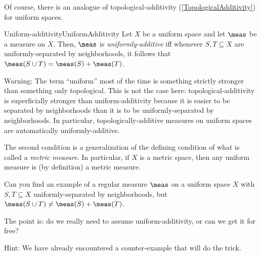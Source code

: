 Of course, there is an analogue of topological-additivity (\cref{TopologicalAdditivity}) for uniform spaces.
\begin{dfn}{Uniform-additivity}{UniformAdditivity}
Let $X$ be a uniform space and let $\meas$ be a measure on $X$.  Then, $\meas$ is \emph{uniformly-additive} iff whenever $S,T\subseteq X$ are uniformly-separated by neighborhoods, it follows that $\meas (S\cup T)=\meas (S)+\meas (T)$.
\begin{wrn}
Warning:  The term ``uniform'' most of the time is something strictly stronger than something only topological.  This is not the case here:  topological-additivity is superficially stronger than uniform-additivity because it is easier to be separated by neighborhoods than it is to be uniformly-separated by neighborhoods.  In particular, topologically-additive measures on uniform spaces are automatically uniformly-additive.
\end{wrn}
\begin{rmk}
The second condition is a generalization of the defining condition of what is called a \emph{metric measure}.  In particular, if $X$ is a metric space, then any uniform measure is (by definition) a metric measure.
\end{rmk}
\end{dfn}
\begin{exr}{}{}
Can you find an example of a regular measure $\meas$ on a uniform space $X$ with $S,T\subseteq X$ uniformly-separated by neighborhoods, but $\meas (S\cup T)\neq \meas (S)+\meas (T)$.
\begin{rmk}
The point is:  do we really need to assume uniform-additivity, or can we get it for free?
\end{rmk}
\begin{rmk}
Hint:  We have already encountered a counter-example that will do the trick.
\end{rmk}
\end{exr}
